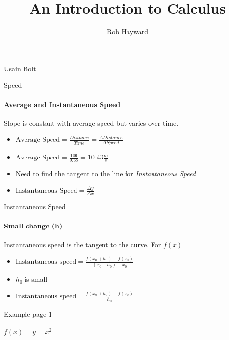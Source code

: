 \documentclass[14pt,xcolor=pdftex,dvipsnames,table]{beamer}
\title{An Introduction to Calculus}
\author{Rob Hayward}
\date{}
\begin{document}
\begin{frame}
\titlepage
\end{frame}


\begin{frame}{Usain Bolt}
\end{frame}

\begin{frame}{Speed}
\framesubtitle{Average and Instantaneous Speed}
Slope is constant with average speed but varies over time.
\pause
\begin{itemize}[<+-| alert@+>]
\item $\text{Average Speed} = \frac{Distance}{Time} = \frac{\Delta Distance}{\Delta Speed}$
\item $\text{Average Speed} = \frac{100}{9.58} = 10.43\frac{m}{s}$
\item Need to find the tangent to the line for \emph{Instantaneous Speed}
\item $\text{Instantaneous Speed} = \frac{\Delta y}{\Delta x}$
\end{itemize}
\end{frame}

\begin{frame}{Instantaneous Speed}
\framesubtitle{Small change (h)}
Instantaneous speed is the tangent to the curve.  For $f(x)$
\pause
\begin{itemize}[<+-| alert@+>]
\item $\text{Instantaneous speed} = \frac{f(x_0 + h_0) - f(x_0)}{(x_0 +h_0) - 
x_0}$ 
\item $h_0$ is small
\item $\text{Instantaneous speed} = \frac{f(x_0 + h_0) - f(x_0)}{h_0}$
\end{itemize}
\end{frame}

\begin{frame}{Example page 1}
\framesubtitle{$f(x) = y = x^2$}
\end{frame}
\end{document}
